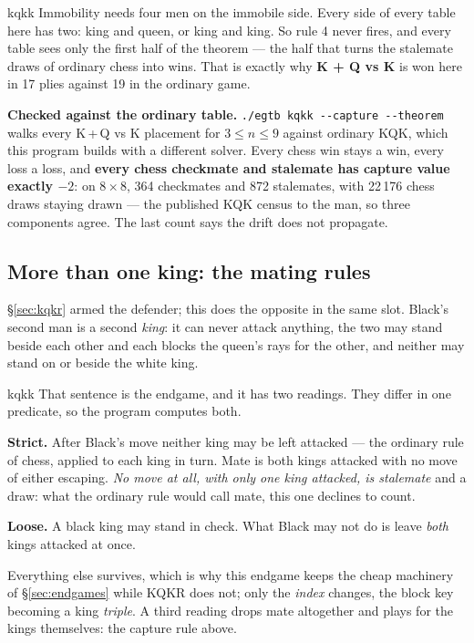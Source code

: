 \documentclass[10pt]{article}
\begin{document}
\begin{result}[title={None of this can happen to the material in this document}]{kqkk}
Immobility needs four men on the immobile side. Every side of every table here
has two: king and queen, or king and king. So rule 4 never fires, and every
table sees only the first half of the theorem --- the half that turns the
stalemate draws of ordinary chess into wins. That is exactly why
\textbf{K + Q vs K} is won here in 17 plies against 19 in the ordinary game.

\smallskip
\textbf{Checked against the ordinary table.}
\texttt{./egtb kqkk -{}-capture -{}-theorem} walks every K\,+\,Q vs K placement
for $3\le n\le9$ against ordinary KQK, which this program builds with a
different solver. Every chess win stays a win, every loss a loss, and
\textbf{every chess checkmate and stalemate has capture value exactly $-2$}: on
$8\times8$, 364 checkmates and 872 stalemates, with 22\,176 chess draws staying
drawn --- the published KQK census to the man, so three components agree. The
last count says the drift does not propagate.
\end{result}

\subsection{More than one king: the mating rules}\label{sub:mating-rules}

\noindent
\S\ref{sec:kqkr} armed the defender; this does the opposite in the same slot.
Black's second man is a second \emph{king}: it can never attack anything, the
two may stand beside each other and each blocks the queen's rays for the other,
and neither may stand on or beside the white king.

\begin{result}[title={A mate counts only when both kings are mated at once}]{kqkk}
That sentence is the endgame, and it has two readings. They differ in one
predicate, so the program computes both.

\smallskip
\textbf{Strict.} After Black's move neither king may be left attacked --- the
ordinary rule of chess, applied to each king in turn. Mate is both kings
attacked with no move of either escaping. \emph{No move at all, with only one
king attacked, is stalemate} and a draw: what the ordinary rule would call
mate, this one declines to count.

\smallskip
\textbf{Loose.} A black king may stand in check. What Black may not do is leave
\emph{both} kings attacked at once.

\medskip
Everything else survives, which is why this endgame keeps the cheap machinery
of \S\ref{sec:endgames} while KQKR does not; only the \emph{index} changes, the
block key becoming a king \emph{triple}. A third reading drops mate altogether
and plays for the kings themselves: the capture rule above.
\end{result}
\end{document}
